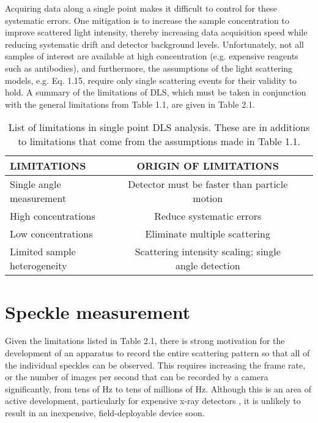 Acquiring data along a single point makes it difficult to control for these systematic errors.   One mitigation is to increase the sample concentration to improve scattered light intensity, thereby increasing data acquisition speed while reducing systematic drift and detector background levels. Unfortunately, not all samples of interest are available at high concentration (e.g. expensive reagents such as antibodies), and furthermore, the assumptions of the light scattering models, e.g. Eq. 1.15, require only single scattering events for their validity to hold.  A summary of the limitations of DLS, which must be taken in conjunction with the general limitations from Table 1.1, are given in Table 2.1. \\

\begin{table}
\begin{center}
\begin{tabular}{|l|c|c|c|}
\hline
{\sc \textbf{LIMITATIONS}}  &  {\sc \textbf{ORIGIN OF LIMITATIONS}} \\
\hline
Single angle measurement  & Detector must be faster than particle motion\\
\hline
High concentrations  & Reduce systematic errors \\
\hline
Low concentrations & Eliminate multiple scattering \\
\hline
Limited sample heterogeneity & Scattering intensity scaling; single angle detection \\
\hline
\end{tabular}
\end{center}
\caption[List of limitations in single point DLS analysis.]{List of limitations in single point DLS analysis.  These are in additions to limitations that come from the assumptions made in Table 1.1.}
\label{table_genomes}
\end{table}

\vspace{10mm}

\section{Speckle measurement}

Given the limitations listed in Table 2.1, there is strong motivation for the development of an apparatus to record the entire scattering pattern so that all of the individual speckles can be observed.  This requires increasing the frame rate, or the number of images per second that can be recorded by a camera significantly, from tens of Hz to tens of millions of Hz.   Although this is an area of active development, particularly for expensive x-ray detectors \citep{Escauriza}, it is unlikely to result in an inexpensive, field-deployable device soon. \\

